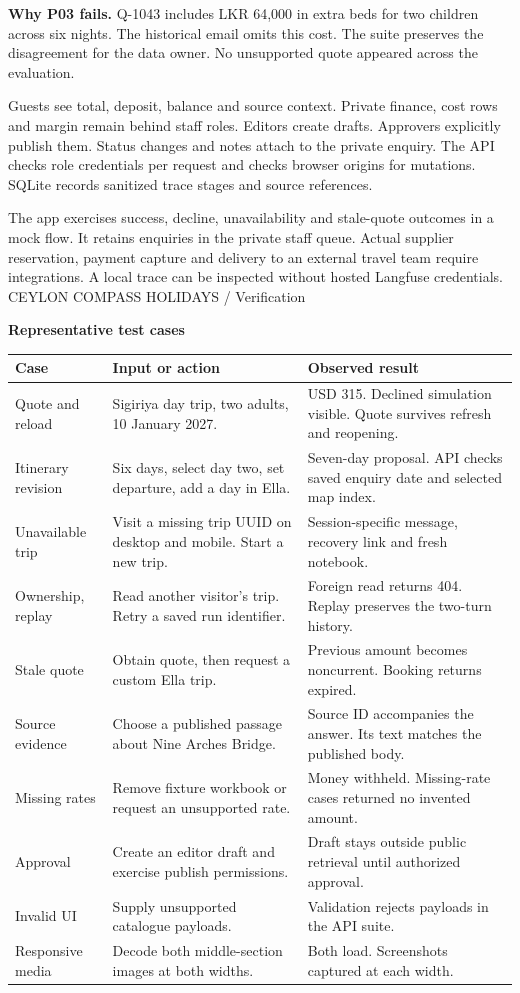 \documentclass[11pt]{article}
\newcommand{\heading}[2]{{\small\color{wine}\sffamily CEYLON COMPASS HOLIDAYS \quad / \quad #1}\par{\Huge\sffamily\bfseries #2}\par\medskip}
\newcommand{\subhead}[1]{\par\medskip{\large\sffamily\bfseries #1}\par}
\begin{document}
\textbf{Why P03 fails.} Q-1043 includes LKR 64,000 in extra beds for two children across six nights. The historical email omits this cost. The suite preserves the disagreement for the data owner. No unsupported quote appeared across the evaluation.
\subhead{Visibility and human approval}
Guests see total, deposit, balance and source context. Private finance, cost rows and margin remain behind staff roles. Editors create drafts. Approvers explicitly publish them. Status changes and notes attach to the private enquiry. The API checks role credentials per request and checks browser origins for mutations. SQLite records sanitized trace stages and source references.
\subhead{What a booking confirms}
The app exercises success, decline, unavailability and stale-quote outcomes in a mock flow. It retains enquiries in the private staff queue. Actual supplier reservation, payment capture and delivery to an external travel team require integrations. A local trace can be inspected without hosted Langfuse credentials.
\newpage
\heading{Verification}{Representative test cases}
\small\begin{tabularx}{\linewidth}{@{}p{.21\linewidth}XX@{}}
\textbf{Case} & \textbf{Input or action} & \textbf{Observed result}\\\hline
Quote and reload & Sigiriya day trip, two adults, 10 January 2027. & USD 315. Declined simulation visible. Quote survives refresh and reopening.\\
Itinerary revision & Six days, select day two, set departure, add a day in Ella. & Seven-day proposal. API checks saved enquiry date and selected map index.\\
Unavailable trip & Visit a missing trip UUID on desktop and mobile. Start a new trip. & Session-specific message, recovery link and fresh notebook.\\
Ownership, replay & Read another visitor's trip. Retry a saved run identifier. & Foreign read returns 404. Replay preserves the two-turn history.\\
Stale quote & Obtain quote, then request a custom Ella trip. & Previous amount becomes noncurrent. Booking returns expired.\\
Source evidence & Choose a published passage about Nine Arches Bridge. & Source ID accompanies the answer. Its text matches the published body.\\
Missing rates & Remove fixture workbook or request an unsupported rate. & Money withheld. Missing-rate cases returned no invented amount.\\
Approval & Create an editor draft and exercise publish permissions. & Draft stays outside public retrieval until authorized approval.\\
Invalid UI & Supply unsupported catalogue payloads. & Validation rejects payloads in the API suite.\\
Responsive media & Decode both middle-section images at both widths. & Both load. Screenshots captured at each width.\\\hline
\end{tabularx}\normalsize
\end{document}
